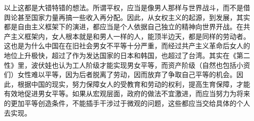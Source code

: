 以上这都是大错特错的想法。所谓平权，应当是像男人那样与世界战斗，而不是借舆论甚至国家力量再搞一些收入再分配。因此，从女权主义的起源，到发展，其实都是自由主义框架下的演进，都应当是个人依据自己独立的精神向世界开战。在共产主义框架内，女人根本就是和男人一样的人，能顶半边天，都是同样的劳动者。这也是为什么中国在在旧社会男女不平等十分严重，而经过共产主义革命后女人的地位上升极快，超过了作为发达国家的日本和韩国，也超过了台湾。其实在《第二性》里，波伏娃也认为工人阶级才能实现男女平等，而资产阶级（自然也包括小资们）女性难以平等，因为后者脱离了劳动，因而放弃了争取自己平等的机会。因此，根据中国的现实，努力保障女人的受教育和劳动的权利，提高生育保障，才能有效地促进男女平等。如果从宏观层面，政府的做法不宜激进，而应当努力为将来的更加平等创造条件，不能插手干涉过于微观的问题，这些都应当交给具体的个人去实现。